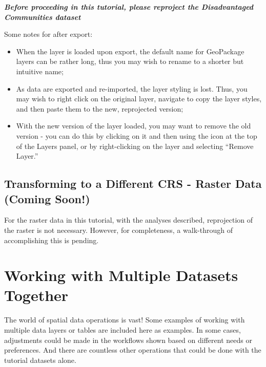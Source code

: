 \documentclass[
  letterpaper,
  DIV=11,
  numbers=noendperiod]{scrreprt}
\providecommand{\tightlist}{%
  \setlength{\itemsep}{0pt}\setlength{\parskip}{0pt}}\usepackage{longtable,booktabs,array}
\begin{document}
\textbf{\emph{Before proceeding in this tutorial, please reproject the
Disadvantaged Communities dataset}}

Some notes for after export:

\begin{itemize}
\tightlist
\item
  When the layer is loaded upon export, the default name for GeoPackage
  layers can be rather long, thus you may wish to rename to a shorter
  but intuitive name;
\item
  As data are exported and re-imported, the layer styling is lost. Thus,
  you may wish to right click on the original layer, navigate to copy
  the layer styles, and then paste them to the new, reprojected version;
\item
  With the new version of the layer loaded, you may want to remove the
  old version - you can do this by clicking on it and then using the
   icon at the
  top of the Layers panel, or by right-clicking on the layer and
  selecting ``Remove Layer.''
\end{itemize}

\hypertarget{transforming-to-a-different-crs---raster-data-coming-soon}{%
\section{Transforming to a Different CRS - Raster Data (Coming
Soon!)}\label{transforming-to-a-different-crs---raster-data-coming-soon}}

For the raster data in this tutorial, with the analyses described,
reprojection of the raster is not necessary. However, for completeness,
a walk-through of accomplishing this is pending.


\hypertarget{working-with-multiple-datasets-together}{%
\chapter{Working with Multiple Datasets
Together}\label{working-with-multiple-datasets-together}}

The world of spatial data operations is vast! Some examples of working
with multiple data layers or tables are included here as examples. In
some cases, adjustments could be made in the workflows shown based on
different needs or preferences. And there are countless other operations
that could be done with the tutorial datasets alone.
\end{document}
